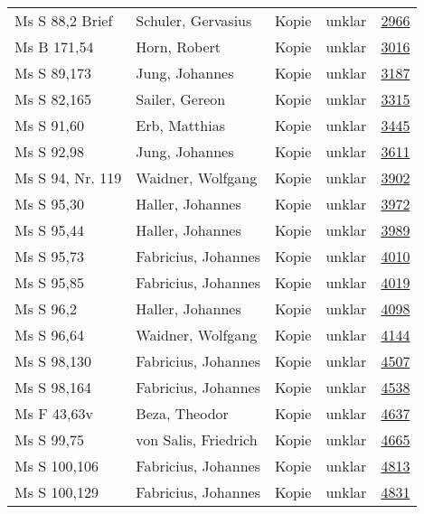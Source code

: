\documentclass[10pt,a4paper,landscape]{report}
\begin{document}
\begin{longtable}{p{16cm}p{4cm}llr}
Ms S 88,2 Brief	&	Schuler, Gervasius	&	Kopie	&	unklar	&	\href{http://130.60.24.72/assignment/2966}{2966}\\
Ms B 171,54	&	Horn, Robert	&	Kopie	&	unklar	&	\href{http://130.60.24.72/assignment/3016}{3016}\\
Ms S 89,173	&	Jung, Johannes	&	Kopie	&	unklar	&	\href{http://130.60.24.72/assignment/3187}{3187}\\
Ms S 82,165	&	Sailer, Gereon	&	Kopie	&	unklar	&	\href{http://130.60.24.72/assignment/3315}{3315}\\
Ms S 91,60	&	Erb, Matthias	&	Kopie	&	unklar	&	\href{http://130.60.24.72/assignment/3445}{3445}\\
Ms S 92,98	&	Jung, Johannes	&	Kopie	&	unklar	&	\href{http://130.60.24.72/assignment/3611}{3611}\\
Ms S 94, Nr. 119	&	Waidner, Wolfgang	&	Kopie	&	unklar	&	\href{http://130.60.24.72/assignment/3902}{3902}\\
Ms S 95,30	&	Haller, Johannes	&	Kopie	&	unklar	&	\href{http://130.60.24.72/assignment/3972}{3972}\\
Ms S 95,44	&	Haller, Johannes	&	Kopie	&	unklar	&	\href{http://130.60.24.72/assignment/3989}{3989}\\
Ms S 95,73	&	Fabricius, Johannes	&	Kopie	&	unklar	&	\href{http://130.60.24.72/assignment/4010}{4010}\\
Ms S 95,85	&	Fabricius, Johannes	&	Kopie	&	unklar	&	\href{http://130.60.24.72/assignment/4019}{4019}\\
Ms S 96,2	&	Haller, Johannes	&	Kopie	&	unklar	&	\href{http://130.60.24.72/assignment/4098}{4098}\\
Ms S 96,64	&	Waidner, Wolfgang	&	Kopie	&	unklar	&	\href{http://130.60.24.72/assignment/4144}{4144}\\
Ms S 98,130	&	Fabricius, Johannes	&	Kopie	&	unklar	&	\href{http://130.60.24.72/assignment/4507}{4507}\\
Ms S 98,164	&	Fabricius, Johannes	&	Kopie	&	unklar	&	\href{http://130.60.24.72/assignment/4538}{4538}\\
Ms F 43,63v	&	Beza, Theodor	&	Kopie	&	unklar	&	\href{http://130.60.24.72/assignment/4637}{4637}\\
Ms S 99,75	&	von Salis, Friedrich	&	Kopie	&	unklar	&	\href{http://130.60.24.72/assignment/4665}{4665}\\
Ms S 100,106	&	Fabricius, Johannes	&	Kopie	&	unklar	&	\href{http://130.60.24.72/assignment/4813}{4813}\\
Ms S 100,129	&	Fabricius, Johannes	&	Kopie	&	unklar	&	\href{http://130.60.24.72/assignment/4831}{4831}\\

\end{longtable}
\end{document}
